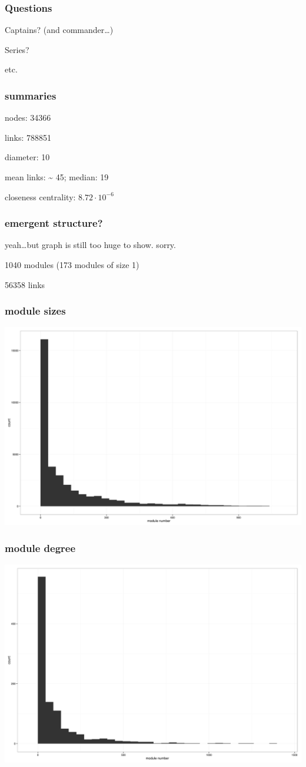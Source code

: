 \documentclass{beamer}
\begin{document}
\begin{frame}
  \frametitle{Questions}
  \huge{Captains? (and commander\ldots )}

  \huge{Series?}

  \huge{etc.}
\end{frame}

\begin{frame}
  \frametitle{summaries}

  nodes: 34366

  links: 788851

  diameter: 10

  mean links: \~{} 45; median: 19

  closeness centrality: \(8.72 \cdot 10^{-6}\)
\end{frame}

\begin{frame}
  \frametitle{emergent structure?}
  yeah\ldots but graph is still too huge to show. sorry.

  1040 modules (173 modules of size 1)

  56358 links
\end{frame}

\begin{frame}
  \frametitle{module sizes}
  \includegraphics[height = 0.8\textheight, keepaspectratio = true]{figure/modules}
\end{frame}

\begin{frame}
  \frametitle{module degree}
  \includegraphics[height = 0.8\textheight, keepaspectratio = true]{figure/mod_deg}
\end{frame}
\end{document}
